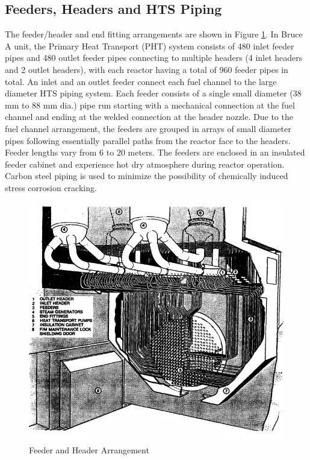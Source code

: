 \documentclass[12pt]{article}
\begin{document}
\begin{multicols}{2}

\subsection{Feeders, Headers and HTS Piping}

The feeder/header and end fitting arrangements are shown in Figure \ref{fig:fig_4}. In Bruce A unit, the Primary Heat Transport (PHT) system consists of 480 inlet feeder pipes and 480 outlet feeder pipes connecting to multiple headers (4 inlet headers and 2 outlet headers), with each reactor having a total of 960 feeder pipes in total. An inlet and an outlet feeder connect each fuel channel to the large diameter HTS piping system. Each feeder consists of a single small diameter (38 mm to 88 mm dia.) pipe run starting with a mechanical connection at the fuel channel and ending at the welded connection at the header nozzle. Due to the fuel channel arrangement, the feeders are grouped in arrays of small diameter pipes following essentially parallel paths from the reactor face to the headers. Feeder lengths vary from 6 to 20 meters. The feeders are enclosed in an insulated feeder cabinet and experience hot dry atmosphere during reactor operation. Carbon steel piping is used to minimize the possibility of chemically induced stress corrosion cracking.

\end{multicols}

\begin{figure}
    \centering
    \includegraphics[width=0.5\linewidth]{figs/feeder-header.png}
    \caption{Feeder and Header Arrangement}
    \label{fig:fig_4}
\end{figure}
\end{document}
